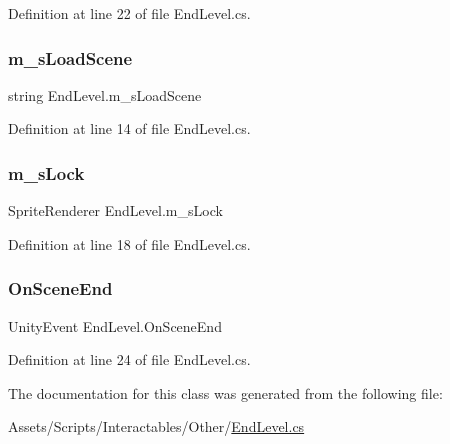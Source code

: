Definition at line 22 of file End\+Level.\+cs.

\mbox{\label{class_end_level_a423a1965b736e789570df5b999cca083}} 
\subsubsection{\texorpdfstring{m\+\_\+s\+Load\+Scene}{m\_sLoadScene}}
{\footnotesize\ttfamily string End\+Level.\+m\+\_\+s\+Load\+Scene}



Definition at line 14 of file End\+Level.\+cs.

\mbox{\label{class_end_level_ad6204a7c789a816b624d2fac2a2b5ff5}} 
\subsubsection{\texorpdfstring{m\+\_\+s\+Lock}{m\_sLock}}
{\footnotesize\ttfamily Sprite\+Renderer End\+Level.\+m\+\_\+s\+Lock}



Definition at line 18 of file End\+Level.\+cs.

\mbox{\label{class_end_level_aee1d2eed042bef3561adbc3697824cac}} 
\subsubsection{\texorpdfstring{On\+Scene\+End}{OnSceneEnd}}
{\footnotesize\ttfamily Unity\+Event End\+Level.\+On\+Scene\+End}



Definition at line 24 of file End\+Level.\+cs.



The documentation for this class was generated from the following file\+:\begin{DoxyCompactItemize}
\item 
Assets/\+Scripts/\+Interactables/\+Other/\mbox{\hyperlink{_end_level_8cs}{End\+Level.\+cs}}\end{DoxyCompactItemize}
